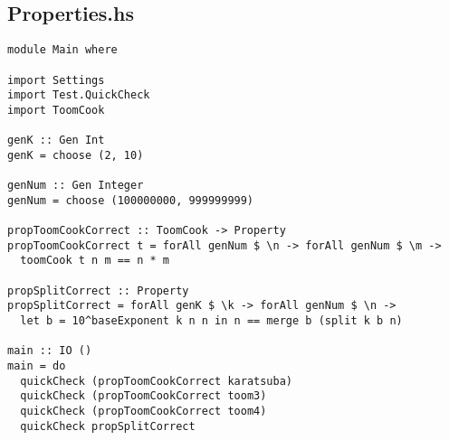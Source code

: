 \subsection{Properties.hs}
\begin{verbatim}
module Main where

import Settings
import Test.QuickCheck
import ToomCook

genK :: Gen Int
genK = choose (2, 10)

genNum :: Gen Integer
genNum = choose (100000000, 999999999)

propToomCookCorrect :: ToomCook -> Property
propToomCookCorrect t = forAll genNum $ \n -> forAll genNum $ \m ->
  toomCook t n m == n * m

propSplitCorrect :: Property
propSplitCorrect = forAll genK $ \k -> forAll genNum $ \n ->
  let b = 10^baseExponent k n n in n == merge b (split k b n)

main :: IO ()
main = do
  quickCheck (propToomCookCorrect karatsuba)
  quickCheck (propToomCookCorrect toom3)
  quickCheck (propToomCookCorrect toom4)
  quickCheck propSplitCorrect
\end{verbatim}
